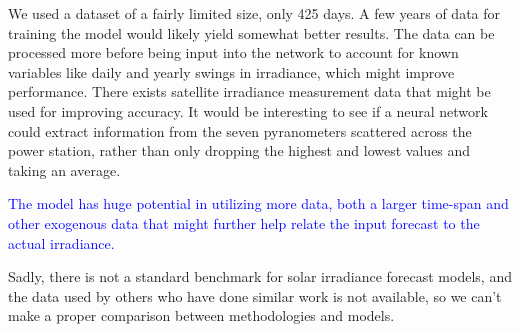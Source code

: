 We used a dataset of a fairly limited size, only 425 days. A few years of data for training the model would likely yield somewhat better results. The data can be processed more before being input into the network to account for known variables like daily and yearly swings in irradiance, which might improve performance. There exists satellite irradiance measurement data that might be used for improving accuracy. It would be interesting to see if a neural network could extract information from the seven pyranometers scattered across the power station, rather than only dropping the highest and lowest values and taking an average. 

\textcolor{blue}{The model has huge potential in utilizing more data, both a larger time-span and other exogenous data that might further help relate the input forecast to the actual irradiance.}

Sadly, there is not a standard benchmark for solar irradiance forecast models, and the data used by others who have done similar work is not available, so we can't make a proper comparison between methodologies and models. 
